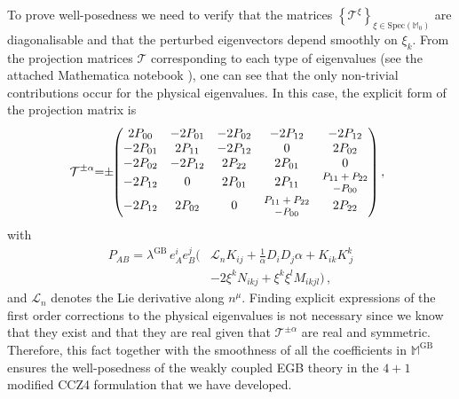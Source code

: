 \documentclass[reprint,aps,amsmath,amssymb,twoside,prd,showkeys,superscriptaddress,nofootinbib]{revtex4-2}
\begin{document}
To prove well-posedness we need to verify that the matrices $\left\{{\mathcal T}^{\xi}\right\}_{\xi\in\text{Spec}({\mathbb M}_0)}$ are diagonalisable and that the perturbed eigenvectors depend smoothly on $\xi_k$. From the projection matrices ${\mathcal T}$ corresponding to each type of eigenvalues (see the attached Mathematica notebook \cite{supp}), one can see that the only non-trivial contributions  occur for the physical eigenvalues. In this case, the explicit form of the projection matrix is 
\begin{eqnarray}
{\mathcal T}^{\pm\alpha}\hspace{-0.1cm}=\hspace{-0.1cm}\pm\hspace{-0.1cm}\begin{pmatrix}
2P_{00} & -2P_{01} & -2P_{02} & -2P_{12} & -2P_{12} \\
-2P_{01} & 2P_{11} & -2P_{12} & 0 & 2P_{02} \\
-2P_{02} & -2P_{12} & 2P_{22} & 2P_{01} & 0 \\
-2P_{12} & 0 & 2P_{01} & 2P_{11} &  \text{\footnotesize $\begin{matrix} P_{11}+P_{22}\\-P_{00} \end{matrix}$}\\
-2P_{12} & 2P_{02} & 0 & \text{\footnotesize $\begin{matrix} P_{11}+P_{22} \\ -P_{00} \end{matrix}$} & 2P_{22}
\end{pmatrix},\hspace{0.2cm}
\end{eqnarray}
with
\begin{equation}
\begin{aligned}
    P_{AB}=\lambda^{\text{GB}}\,e_A^ie_B^j(&{\mathcal L}_nK_{ij}+\frac{1}{\alpha}D_iD_j\alpha+K_{ik}K^k_{~j}\\
    &-2\xi^kN_{ikj}+\xi^k\xi^lM_{ikjl})\,,
\end{aligned}
\end{equation}
and ${\mathcal L}_n$ denotes the Lie derivative along $n^{\mu}$. Finding explicit expressions of the first order corrections to the physical eigenvalues is not necessary since we know that they exist and that they are real given that ${\mathcal T}^{\pm\alpha}$ are real and  symmetric. Therefore, this fact together with the smoothness of all the coefficients in ${\mathbb M}^{\text{GB}}$ ensures the well-posedness of the weakly coupled EGB theory in the $4+1$ modified CCZ4 formulation that we have developed.
\end{document}
